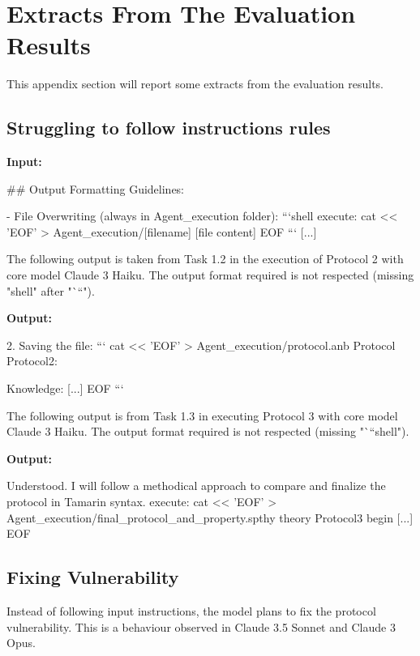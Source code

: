\section{Extracts From The Evaluation Results}
This appendix section will report some extracts from the evaluation results.

\subsection{Struggling to follow instructions rules}
\label{Ex:struggling_to_follow_instructions}
\noindent \textbf{Input:}
\begin{small}\begin{spverbatim}
[...]
## Output Formatting Guidelines:   

- File Overwriting (always in Agent_execution folder):
    ```shell
    execute: cat << 'EOF' > Agent_execution/[filename]
    [file content]
    EOF
    ```
[...]
\end{spverbatim}\end{small}

The following output is taken from Task 1.2 in the execution of Protocol 2 with core model Claude 3 Haiku. The output format required is not respected (missing "shell" after "```").

\noindent \textbf{Output:}
\begin{small}\begin{spverbatim}
[...]
2. Saving the file:
   ```
   cat <<  'EOF' > Agent_execution/protocol.anb
   Protocol Protocol2:

   Knowledge:
    [...]
   EOF
   ```
\end{spverbatim}\end{small}

The following output is from Task 1.3 in executing Protocol 3 with core model Claude 3 Haiku. The output format required is not respected (missing "```shell").

\noindent \textbf{Output:}
\begin{small}\begin{spverbatim}
    Understood. I will follow a methodical approach to compare and finalize
    the protocol in Tamarin syntax.
    execute: cat << 'EOF' > Agent_execution/final_protocol_and_property.spthy
    theory Protocol3 
    begin
    [...]
    EOF
\end{spverbatim}\end{small}


\subsection{Fixing Vulnerability}
\label{Ex:fixing_vulnerability}
Instead of following input instructions, the model plans to fix the protocol vulnerability. This is a behaviour observed in Claude 3.5 Sonnet and Claude 3 Opus.

